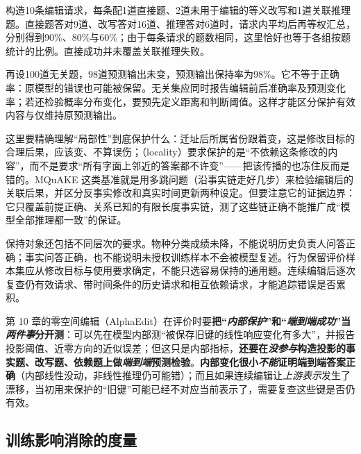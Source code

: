 构造10条编辑请求，每条配1道直接题、2道未用于编辑的等义改写和1道关联推理题。直接题答对9道、改写答对16道、推理答对6道时，请求内平均后再等权汇总，分别得到90\%、80\%与60\%；由于每条请求的题数相同，这里恰好也等于各组按题统计的比例。直接成功并未覆盖关联推理失败。

再设100道无关题，98道预测输出未变，预测输出保持率为98\%。它不等于正确率：原模型的错误也可能被保留。无关集应同时报告编辑前后准确率及预测变化率；若还检验概率分布变化，要预先定义距离和判断阈值。这样才能区分保护有效内容与仅维持原预测输出。

这里要精确理解“局部性”到底保护什么：迁址后所属省份跟着变，这是修改目标的合理后果，应该变、不算误伤；（locality）要求保护的是“不依赖这条修改的内容”，而不是要求“所有字面上邻近的答案都不许变”——把该传播的也冻住反而是错的。MQuAKE 这类基准就是用多跳问题（沿事实链走好几步）来检验编辑后的关联后果，并区分反事实修改和真实时间更新两种设定。但要注意它的证据边界：它只覆盖前提正确、关系已知的有限长度事实链，测了这些链正确不能推广成“模型全部推理都一致”的保证。

保持对象还包括不同层次的要求。物种分类成绩未降，不能说明历史负责人问答正确；事实问答正确，也不能说明未授权训练样本不会被模型复述。行为保留评价样本集应从修改目标与使用要求确定，不能只选容易保持的通用题。连续编辑后逐次复查仍有效请求、带时间条件的历史请求和相互依赖请求，才能追踪错误是否累积。

第 10 章的零空间编辑（AlphaEdit）在评价时要\textbf{把“\emph{内部保护}”和“\emph{端到端成功}”当\emph{两件事}分开测}：可以先在模型内部测“被保存旧键的线性响应变化有多大”，并报告投影阈值、近零方向的近似误差；但这只是内部指标，\textbf{还要在\emph{没参与}构造投影的事实题、改写题、依赖题上做\emph{端到端}预测检验}。\textbf{内部变化很小\emph{不能}证明端到端答案正确}（内部线性没动，非线性推理仍可能错）；而且如果连续编辑让\emph{上游表示}发生了漂移，当初用来保护的“旧键”可能已经不对应当前表示了，需要复查这些键是否仍有效。

\subsection{训练影响消除的度量}
\label{sec:ket-evolution-evaluation-unlearning}

